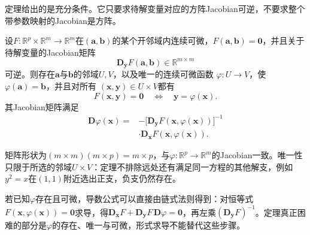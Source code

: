 定理给出的是充分条件。它只要求待解变量对应的方阵Jacobian可逆，不要求整个带参数映射的Jacobian是方阵。
\begin{theorem}[隐函数定理]
\label{thm:analysis-implicit-function}
设$F:\mathbb{R}^p\times\mathbb{R}^m\to\mathbb{R}^m$在$(\bm{a},\bm{b})$的某个开邻域内连续可微，$F(\bm{a},\bm{b})=\bm{0}$，并且关于待解变量的Jacobian矩阵
\[
 \bm{D}_{\bm{y}}F(\bm{a},\bm{b})\in\mathbb{R}^{m\times m}
\]
可逆。则存在$\bm{a}$与$\bm{b}$的邻域$U,V$，以及唯一的连续可微函数
$\varphi:U\to V$，使$\varphi(\bm{a})=\bm{b}$，并且对所有
$(\bm{x},\bm{y})\in U\times V$都有
\[
  F(\bm{x},\bm{y})=\bm{0}
  \quad\Longleftrightarrow\quad
  \bm{y}=\varphi(\bm{x}).
\]
其Jacobian矩阵满足
\begin{equation}
  \begin{aligned}
  \bm{D}\varphi(\bm{x})
  ={}&-\bigl[\bm{D}_{\bm{y}}F(\bm{x},\varphi(\bm{x}))\bigr]^{-1}\\
  &\cdot\bm{D}_{\bm{x}}F(\bm{x},\varphi(\bm{x})).
  \end{aligned}
\label{eq:analysis-implicit-derivative}
\end{equation}
\end{theorem}
矩阵形状为$(m\times m)(m\times p)=m\times p$，与$\varphi:\mathbb R^p\to\mathbb R^m$的Jacobian一致。唯一性只限于所选的邻域$U\times V$：定理不排除远处还有满足同一方程的其他解支，例如$y^2=x$在$(1,1)$附近选出正支，负支仍然存在。

若已知$\varphi$存在且可微，导数公式可以直接由链式法则得到：对恒等式$F(\bm x,\varphi(\bm x))=\bm 0$求导，得$\bm D_{\bm x}F+\bm D_{\bm y}F\,\bm D\varphi=\bm 0$，再左乘$(\bm D_{\bm y}F)^{-1}$。定理真正困难的部分是$\varphi$的存在、唯一与可微，形式求导不能替代这些步骤。


